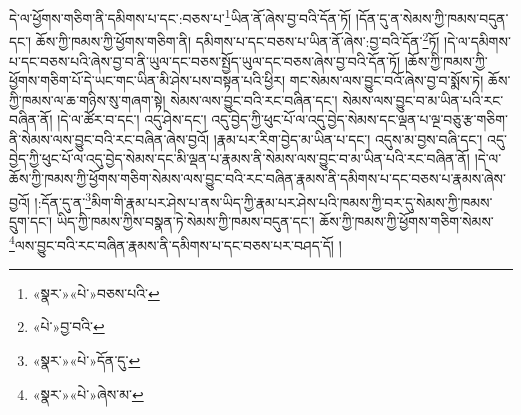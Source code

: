 དེ་ལ་ཕྱོགས་གཅིག་ནི་དམིགས་པ་དང་:བཅས་པ་\footnote{«སྣར་»«པེ་»བཅས་པའི་}ཡིན་ནོ་ཞེས་བྱ་བའི་དོན་ཏོ། །དོན་དུ་ན་སེམས་ཀྱི་ཁམས་བདུན་དང་། ཆོས་ཀྱི་ཁམས་ཀྱི་ཕྱོགས་གཅིག་ནི། དམིགས་པ་དང་བཅས་པ་ཡིན་ནོ་ཞེས་:བྱ་བའི་དོན་\footnote{«པེ་»བྱ་བའི་}ཏོ། །དེ་ལ་དམིགས་པ་དང་བཅས་པའི་ཞེས་བྱ་བ་ནི་ཡུལ་དང་བཅས་སྤྱོད་ཡུལ་དང་བཅས་ཞེས་བྱ་བའི་དོན་ཏོ། །ཆོས་ཀྱི་ཁམས་ཀྱི་ཕྱོགས་གཅིག་པོ་དེ་ཡང་གང་ཡིན་མི་ཤེས་པས་བསྟན་པའི་ཕྱིར། གང་སེམས་ལས་བྱུང་བའོ་ཞེས་བྱ་བ་སྨོས་ཏེ། ཆོས་ཀྱི་ཁམས་ལ་ཆ་གཉིས་སུ་གཞག་སྟེ། སེམས་ལས་བྱུང་བའི་རང་བཞིན་དང་། སེམས་ལས་བྱུང་བ་མ་ཡིན་པའི་རང་བཞིན་ནོ། །དེ་ལ་ཚོར་བ་དང་། འདུ་ཤེས་དང་། འདུ་བྱེད་ཀྱི་ཕུང་པོ་ལ་འདུ་བྱེད་སེམས་དང་ལྡན་པ་ལྔ་བཅུ་རྩ་གཅིག་ནི་སེམས་ལས་བྱུང་བའི་རང་བཞིན་ཞེས་བྱའོ། །རྣམ་པར་རིག་བྱེད་མ་ཡིན་པ་དང་། འདུས་མ་བྱས་བཞི་དང་། འདུ་བྱེད་ཀྱི་ཕུང་པོ་ལ་འདུ་བྱེད་སེམས་དང་མི་ལྡན་པ་རྣམས་ནི་སེམས་ལས་བྱུང་བ་མ་ཡིན་པའི་རང་བཞིན་ནོ། །དེ་ལ་ཆོས་ཀྱི་ཁམས་ཀྱི་ཕྱོགས་གཅིག་སེམས་ལས་བྱུང་བའི་རང་བཞིན་རྣམས་ནི་དམིགས་པ་དང་བཅས་པ་རྣམས་ཞེས་བྱའོ། །:དོན་དུ་ན་\footnote{«སྣར་»«པེ་»དོན་དུ་}མིག་གི་རྣམ་པར་ཤེས་པ་ནས་ཡིད་ཀྱི་རྣམ་པར་ཤེས་པའི་ཁམས་ཀྱི་བར་དུ་སེམས་ཀྱི་ཁམས་དྲུག་དང་། ཡིད་ཀྱི་ཁམས་ཀྱིས་བསྣན་ཏེ་སེམས་ཀྱི་ཁམས་བདུན་དང་། ཆོས་ཀྱི་ཁམས་ཀྱི་ཕྱོགས་གཅིག་སེམས་\footnote{«སྣར་»«པེ་»ཞེས་མ་}ལས་བྱུང་བའི་རང་བཞིན་རྣམས་ནི་དམིགས་པ་དང་བཅས་པར་བཤད་དོ། །
